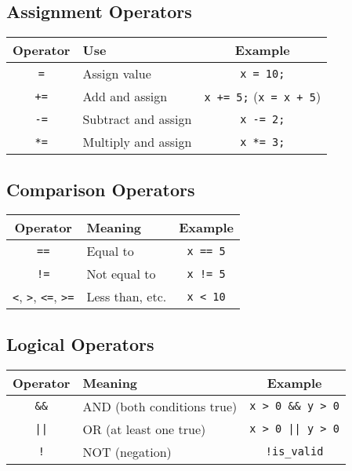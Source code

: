 \documentclass{article}
\begin{document}
\subsection*{Assignment Operators}

\begin{center}
\begin{tabular}{|c|l|c|}
\hline
\textbf{Operator} & \textbf{Use} & \textbf{Example} \\
\hline
\texttt{=} & Assign value & \texttt{x = 10;} \\
\hline
\texttt{+=} & Add and assign & \texttt{x += 5;} (\texttt{x = x + 5}) \\
\hline
\texttt{-=} & Subtract and assign & \texttt{x -= 2;} \\
\hline
\texttt{*=} & Multiply and assign & \texttt{x *= 3;} \\
\hline
\end{tabular}
\end{center}

\subsection*{Comparison Operators}

\begin{center}
\begin{tabular}{|c|l|c|}
\hline
\textbf{Operator} & \textbf{Meaning} & \textbf{Example} \\
\hline
\texttt{==} & Equal to & \texttt{x == 5} \\
\hline
\texttt{!=} & Not equal to & \texttt{x != 5} \\
\hline
\texttt{<}, \texttt{>}, \texttt{<=}, \texttt{>=} & Less than, etc. & \texttt{x < 10} \\
\hline
\end{tabular}
\end{center}

\subsection*{Logical Operators}

\begin{center}
\begin{tabular}{|c|l|c|}
\hline
\textbf{Operator} & \textbf{Meaning} & \textbf{Example} \\
\hline
\texttt{\&\&} & AND (both conditions true) & \texttt{x > 0 \&\& y > 0} \\
\hline
\texttt{||} & OR (at least one true) & \texttt{x > 0 || y > 0} \\
\hline
\texttt{!} & NOT (negation) & \texttt{!is\_valid} \\
\hline
\end{tabular}
\end{center}
\end{document}
